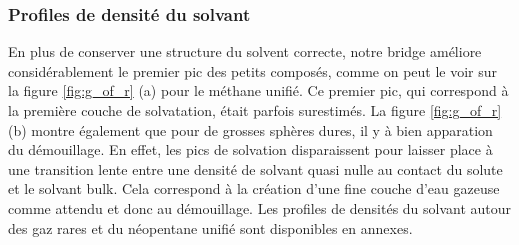 \subsubsection{Profiles de densité du solvant}
En plus de conserver une structure du solvent correcte, notre bridge améliore considérablement le premier pic des petits composés, comme on peut le voir sur la figure \ref{fig:g_of_r} (a) pour le méthane unifié. Ce premier pic, qui correspond à la première couche de solvatation, était parfois surestimés. La figure \ref{fig:g_of_r} (b) montre également que pour de grosses sphères dures, il y à bien apparation du démouillage. En effet, les pics de solvation disparaissent pour laisser place à une transition lente entre une densité de solvant quasi nulle au contact du solute et le solvant bulk. Cela correspond à la création d'une fine couche d'eau gazeuse comme attendu et donc au démouillage. Les profiles de densités du solvant autour des gaz rares et du néopentane unifié sont disponibles en annexes.




